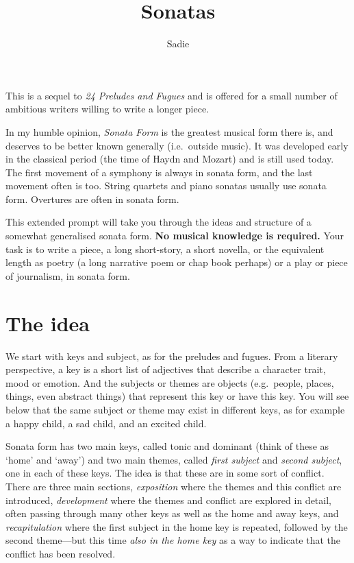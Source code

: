 \documentclass[a4paper]{article}
\title{Sonatas}
\author{Sadie}
\begin{document}
\maketitle

This is a sequel to \textit{24 Preludes and Fugues}
and is offered for a small number of ambitious writers willing to
write a longer piece.

In my humble opinion, \textit{Sonata Form} is the greatest musical form
there is, and deserves to be better known generally (i.e.~outside
music).  It was developed early in the classical period (the time of
Haydn and Mozart) and is still used today.  The first movement of a
symphony is always in sonata form, and the last movement often is too.
String quartets and piano sonatas usually use sonata form.
Overtures are often in sonata form.

This extended prompt will take you through the ideas and structure of
a somewhat generalised sonata form.  \textbf{No musical knowledge is required.}
Your task is to write a piece, a long short-story, a short novella, or
the equivalent length as poetry (a long narrative poem or
chap book perhaps) or a play or
piece of journalism, in sonata form.

\section{The idea}

We start with keys and subject, as for the preludes and fugues.
From a literary perspective, a key is a short list of adjectives
that describe a character trait, mood or emotion.  And the subjects or themes
are objects (e.g.~people, places, things, even abstract things)
that represent this key or have this key.  You will see below that
the same subject or theme may exist in different keys, as for example
a happy child, a sad child, and an excited child.

Sonata form has two main keys, called tonic and dominant (think
of these as `home' and `away')
and two main themes, called \textit{first subject} and
\textit{second subject}, one in each of these keys.  The idea
is that these are in some sort of conflict.  There are three main sections,
\textit{exposition} where the themes and this conflict are
introduced, \textit{development} where the themes and conflict
are explored in detail, often passing through many other keys
as well as the home and away keys, and \textit{recapitulation}
where the first subject in the home key is repeated, followed by the
second theme---but this time \textit{also in the home key} as a way
to indicate that the conflict has been resolved.
\end{document}
